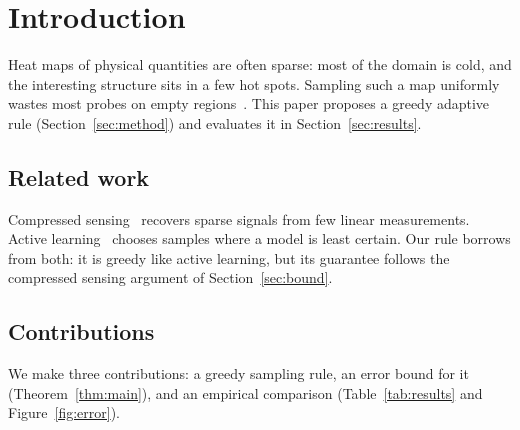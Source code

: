 \section{Introduction}\label{sec:intro}
Heat maps of physical quantities are often sparse: most of the domain is cold,
and the interesting structure sits in a few hot spots. Sampling such a map
uniformly wastes most probes on empty regions~\cite{candes2006}. This paper
proposes a greedy adaptive rule (Section~\ref{sec:method}) and evaluates it in
Section~\ref{sec:results}.

\subsection{Related work}\label{sec:related}
Compressed sensing~\cite{candes2006,donoho2006} recovers sparse signals from
few linear measurements. Active learning~\cite{settles2009} chooses samples
where a model is least certain. Our rule borrows from both: it is greedy like
active learning, but its guarantee follows the compressed sensing argument of
Section~\ref{sec:bound}.

\subsection{Contributions}
We make three contributions: a greedy sampling rule, an error bound for it
(Theorem~\ref{thm:main}), and an empirical comparison
(Table~\ref{tab:results} and Figure~\ref{fig:error}).
